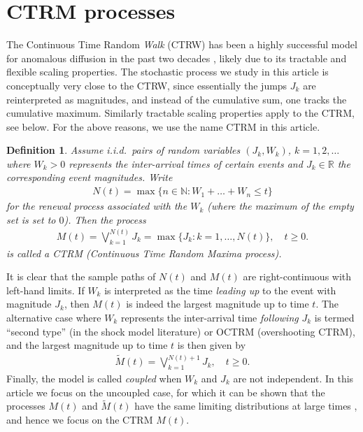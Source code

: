 \documentclass[12pt]{article}
\newtheorem{definition}[theorem]{Definition}
\theoremstyle{definition}
\theoremstyle{remark}
\numberwithin{equation}{section}
\newcommand{\R}{\mathbb R}
\newcommand{\1}{\mathbf 1}
\begin{document}
\section{CTRM processes}

The Continuous Time Random \emph{Walk} (CTRW) has been a highly successful 
model for anomalous diffusion in the past two decades 
\cite{Metzler2000,HLS2010b}, likely due to its tractable and flexible scaling
properties.
The stochastic process we study in this article is conceptually very close
to the CTRW, since essentially the jumps $J_k$ are reinterpreted as 
magnitudes, and instead of the cumulative sum, one tracks the cumulative 
maximum. Similarly tractable scaling properties apply to the CTRM, see below.
For the above reasons, we use the name CTRM in this article.


\begin{definition}
Assume i.i.d.\ pairs of random variables $(J_k, W_k)$, $k = 1, 2, \ldots$
where $W_k > 0$ represents the inter-arrival times of certain events and 
$J_k \in \R$ the corresponding event magnitudes.  
Write 
\begin{align} \label{eq:renewal-process}
N(t) = \max\{n \in \mathbb N: W_1 + \ldots + W_n \le t\}
\end{align}
for the renewal process
associated with the $W_k$ (where the maximum of the empty set is set to $0$).
Then the process
\begin{align}
M(t) = \bigvee_{k=1}^{N(t)} J_k
= \max\{J_k: k = 1, \ldots, N(t)\}, \quad t \ge 0.
\end{align}
is called a CTRM (Continuous Time Random Maxima process).
\end{definition}

 

It is clear that the sample paths of $N(t)$ and $M(t)$ are right-continuous
with left-hand limits. 
If $W_k$ is interpreted as the time \emph{leading up} to the event with magnitude
$J_k$, then $M(t)$ is indeed the largest magnitude up to time $t$.
The alternative case where $W_k$ represents the inter-arrival time 
\textit{following} $J_k$ 
is termed ``second type'' (in the shock model literature) or OCTRM
(overshooting CTRM), and the largest magnitude up to time $t$ is then
given by
\begin{align}
\tilde M(t) = \bigvee_{k=1}^{N(t)+1} J_k, \quad t \ge 0.
\end{align}
Finally, the model is called \emph{coupled} when $W_k$ and $J_k$ are not independent.
In this article we focus on the uncoupled case,  
for which it can be shown that the processes $M(t)$ and
$\tilde M(t)$ have the same limiting distributions at large times
\cite{Hees16}, and hence we focus on the CTRM $M(t)$. 
\end{document}
